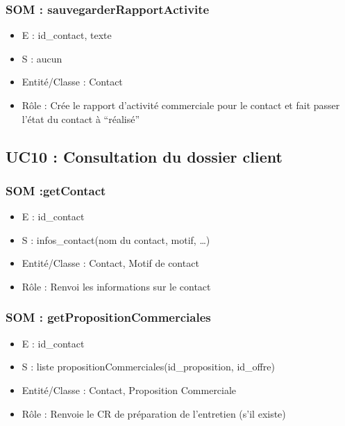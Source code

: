 \subsubsection{SOM : sauvegarderRapportActivite}
	\begin{itemize}
		\item E : id\_contact, texte
		\item S : aucun
		\item Entité/Classe : Contact
		\item Rôle : Crée le rapport d’activité commerciale pour le contact et fait passer l’état du
	contact à “réalisé”
	\end{itemize}



\subsection{UC10 : Consultation du dossier client}

\subsubsection{SOM :getContact}
	\begin{itemize}
		\item E : id\_contact
		\item S : infos\_contact(nom du contact, motif, …)
		\item Entité/Classe : Contact, Motif de contact
		\item Rôle : Renvoi les informations sur le contact
	\end{itemize}

\subsubsection{SOM : getPropositionCommerciales}
	\begin{itemize}
		\item E : id\_contact
		\item S : liste propositionCommerciales(id\_proposition, id\_offre)
		\item Entité/Classe : Contact, Proposition Commerciale
		\item Rôle : Renvoie le CR de préparation de l’entretien (s’il existe)
	\end{itemize}
